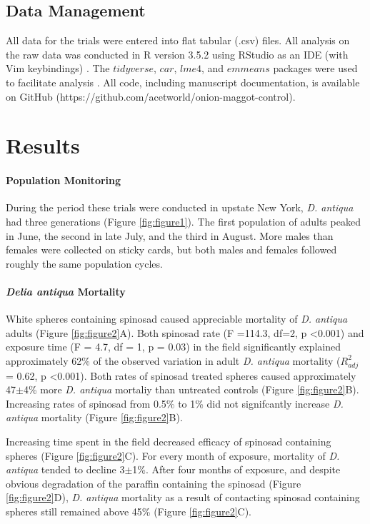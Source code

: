 \documentclass[alpha-refs]{wiley-article}
\begin{document}
\subsection{Data Management}

All data for the trials were entered into flat tabular (.csv) files.  All analysis on the raw data was conducted in R version 3.5.2 using RStudio as an IDE (with Vim keybindings) \citep{rcore2018,rstudio}.  The $tidyverse$, $car$, $lme4$, and $emmeans$ packages were used to facilitate analysis \citep{tidy, car, lme, emmeans}.  All code, including manuscript documentation, is available on GitHub (https://github.com/acetworld/onion-maggot-control).


\section{Results}

\paragraph{Population Monitoring}

During the period these trials were conducted in upstate New York, \textit{D. antiqua} had three generations (Figure \ref{fig:figure1}).  The first population of adults peaked in June, the second in late July, and the third in August.  More males than females were collected on sticky cards, but both males and females followed roughly the same population cycles. 

\paragraph{\textit{Delia antiqua} Mortality}

White spheres containing spinosad caused appreciable mortality of \textit{D. antiqua} adults (Figure \ref{fig:figure2}A).  Both spinosad rate (F =114.3, df=2, p \textless 0.001)  and exposure time (F = 4.7, df = 1, p = 0.03) in the field significantly explained approximately 62\% of the observed variation in adult \textit{D. antiqua} mortality ($R^2_{adj}$ = 0.62, p \textless 0.001).  Both rates of spinosad treated spheres caused approximately 47$\pm$4\% more \textit{D. antiqua} mortaliy than untreated controls (Figure \ref{fig:figure2}B).  Increasing rates of spinosad from 0.5\% to 1\% did not signifcantly increase \textit{D. antiqua} mortality (Figure \ref{fig:figure2}B).  

Increasing time spent in the field decreased efficacy of spinosad containing spheres (Figure \ref{fig:figure2}C).  For every month of exposure, mortality of \textit{D. antiqua} tended to decline 3$\pm$1\%.  After four months of exposure, and despite obvious degradation of the paraffin containing the spinosad (Figure \ref{fig:figure2}D), \textit{D. antiqua} mortality as a result of contacting spinosad containing spheres still remained above 45\% (Figure \ref{fig:figure2}C).  
\end{document}
